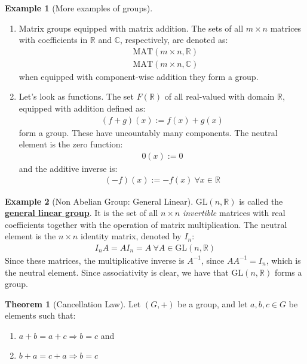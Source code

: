 \documentclass[11pt]{scrartcl}
\newcommand{\R}[0]{\mathbb{R}}
\theoremstyle{definition}
\newtheorem{theorem}{Theorem}
\newtheorem{ex}{Example}
\theoremstyle{remark}
\newcommand{\dfn}[1]{\textbf{\underline{#1}}}
\newcommand{\C}[0]{\mathbb{C}}
\newcommand{\mat}[1]{\text{MAT}(m \times n, \mathbb{#1})}
\newcommand{\gl}[1]{\text{GL}(n, \mathbb{#1})}
\begin{document}
\begin{ex}[More examples of groups]
	\begin{enumerate}
		\item Matrix groups equipped with matrix addition. The sets of all $m \times n$ matrices with coefficients in $\R$ and $\C$, respectively, are denoted as: 
		\begin{align*}
			& \mat{R} \\
			& \mat{C} 	
		\end{align*}
		when equipped with component-wise addition they form a group. 
	\item Let's look as functions. The set $F(\R)$ of all real-valued with domain $\R$, equipped with addition defined as: 
	\begin{align*}
		(f+g)(x) := f(x) + g(x)	
	\end{align*}
	form a group. These have uncountably many components. The neutral element is the zero function: 
	\begin{align*}
		0(x) := 0 	
	\end{align*}
	and the additive inverse is: 
	\begin{align*}
		(-f)(x) := -f(x)\ \forall x \in \R 	
	\end{align*}
	\end{enumerate}
\end{ex}

\begin{ex}[Non Abelian Group: General Linear]  $\gl{R}$ is called the \dfn{general linear group}. It is the set of all $n \times n$ \emph{invertible} matrices with real coefficients together with the operation of matrix multiplication. The neutral element is the $n \times n$ identity matrix, denoted by $I_n$: 
		\begin{align*}
			I_n A = A I_n = A\ \forall A \in \gl{R}	
		\end{align*}
		Since these matrices, the multiplicative inverse is $A^{-1}$, since $A A^{-1} = I_n$, which is the neutral element. Since associativity is clear, we have that $\gl{R}$ forms a group. 
\end{ex}

\begin{theorem}[Cancellation Law]
	Let $(G, +)$ be a group, and let $a,b,c \in G$ be elements such that: 
	\begin{enumerate}[noitemsep]
		\item $a + b = a + c \Rightarrow b = c$ and 
		\item $b + a = c + a \Rightarrow b = c$
	\end{enumerate}
\end{theorem}
\end{document}
